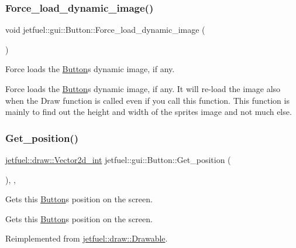 \subsubsection{\texorpdfstring{Force\+\_\+load\+\_\+dynamic\+\_\+image()}{Force\_load\_dynamic\_image()}}
{\footnotesize\ttfamily void jetfuel\+::gui\+::\+Button\+::\+Force\+\_\+load\+\_\+dynamic\+\_\+image (\begin{DoxyParamCaption}{ }\end{DoxyParamCaption})\hspace{0.3cm}{\ttfamily [inline]}}



Force loads the \hyperlink{classjetfuel_1_1gui_1_1Button}{Button}\textquotesingle{}s dynamic image, if any. 

Force loads the \hyperlink{classjetfuel_1_1gui_1_1Button}{Button}\textquotesingle{}s dynamic image, if any. It will re-\/load the image also when the Draw function is called even if you call this function. This function is mainly to find out the height and width of the sprite\textquotesingle{}s image and not much else. \mbox{\label{classjetfuel_1_1gui_1_1Button_aadcceacaabaa40bceb293d1f91231d22}} 
\subsubsection{\texorpdfstring{Get\+\_\+position()}{Get\_position()}}
{\footnotesize\ttfamily \hyperlink{classjetfuel_1_1draw_1_1Vector2d}{jetfuel\+::draw\+::\+Vector2d\+\_\+int} jetfuel\+::gui\+::\+Button\+::\+Get\+\_\+position (\begin{DoxyParamCaption}{ }\end{DoxyParamCaption})\hspace{0.3cm}{\ttfamily [inline]}, {\ttfamily [override]}, {\ttfamily [virtual]}}



Gets this \hyperlink{classjetfuel_1_1gui_1_1Button}{Button}\textquotesingle{}s position on the screen. 

Gets this \hyperlink{classjetfuel_1_1gui_1_1Button}{Button}\textquotesingle{}s position on the screen. 

Reimplemented from \hyperlink{classjetfuel_1_1draw_1_1Drawable_ae7ebd30d66db2c8a5d5371cbcf0023fc}{jetfuel\+::draw\+::\+Drawable}.

